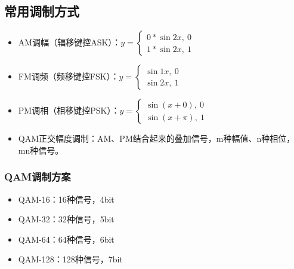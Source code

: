 \subsection{常用调制方式}
\begin{itemize}
    \item AM调幅（辐移键控ASK）：\(y = \begin{cases}
        0 * \sin2x,\ 0 \\ 
        1 * \sin2x,\ 1
    \end{cases}\)
    \item FM调频（频移键控FSK）：\(y = \begin{cases}
        \sin1x,\ 0 \\ 
        \sin2x,\ 1
    \end{cases}\)
    \item PM调相（相移键控PSK）：\(y = \begin{cases}
        \sin(x + 0),\ 0 \\ 
        \sin(x + \pi),\ 1
    \end{cases}\)
    \item QAM正交幅度调制：AM、PM结合起来的叠加信号，m种幅值、n种相位，mn种信号。
\end{itemize}

\subsubsection{QAM调制方案}
\begin{itemize}
    \item QAM-16：16种信号，4bit
    \item QAM-32：32种信号，5bit
    \item QAM-64：64种信号，6bit
    \item QAM-128：128种信号，7bit
\end{itemize}






